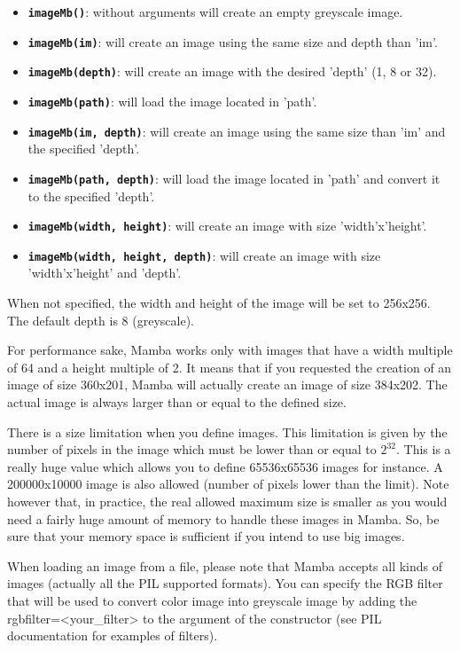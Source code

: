 \documentclass[a4paper,10pt,oneside]{article}
\begin{document}
\begin{itemize}
\item \texttt{\textbf{imageMb()}}: without arguments will create an empty 
greyscale image.
\item \texttt{\textbf{imageMb(im)}}: will create an image using the same size 
and depth than 'im'.
\item \texttt{\textbf{imageMb(depth)}}: will create an image with the desired
'depth' (1, 8 or 32).
\item \texttt{\textbf{imageMb(path)}}: will load the image located in 'path'.
\item \texttt{\textbf{imageMb(im, depth)}}: will create an image using the same 
size than 'im' and the specified 'depth'.
\item \texttt{\textbf{imageMb(path, depth)}}: will load the image located in 
'path' and convert it to the specified 'depth'.
\item \texttt{\textbf{imageMb(width, height)}}: will create an image with size 
'width'x'height'.
\item \texttt{\textbf{imageMb(width, height, depth)}}: will create an image with
size 'width'x'height' and 'depth'.
\end{itemize}

When not specified, the width and height of the image will be set to 
256x256. The default depth is 8 (greyscale).

For performance sake, Mamba works only with images that have a width multiple of
64 and a height multiple of 2. It means that if you requested the creation of
an image of size 360x201, Mamba will actually create an image of size 384x202. 
The actual image is always larger than or equal to the defined size.

There is a size limitation when you define images. This limitation is given by
the number of pixels in the image which must be lower than or equal to $2^{32}$.
This is a really huge value which allows you to define 65536x65536 images for instance.
A 200000x10000 image is also allowed (number of pixels lower than the limit).
Note however that, in practice, the real allowed maximum size is smaller as you would
need a fairly huge amount of memory to handle these images in Mamba. So, be sure
that your memory space is sufficient if you intend to use big images.

When loading an image from a file, please note that Mamba accepts all 
kinds of images (actually all the PIL supported formats). You can specify
the RGB filter that will be used to convert color image into greyscale 
image by adding the rgbfilter=<your\_filter> to the argument of the
constructor (see PIL documentation for examples of filters).
\end{document}
